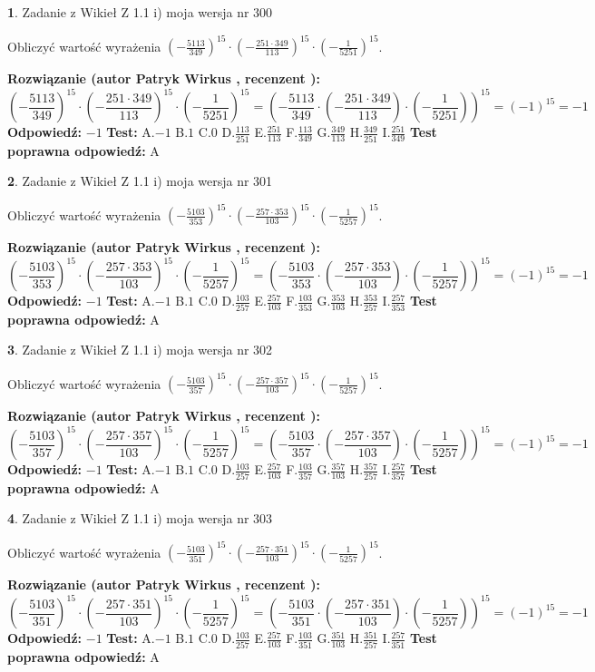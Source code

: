 \documentclass[12pt, a4paper]{article}
\theoremstyle{definition} %
\newtheorem{zad}{}
\newcommand{\zadStart}[1]{\begin{zad}#1\newline}
\newcommand{\zadStop}{\end{zad}}
\newcommand{\rozwStart}[2]{\noindent \textbf{Rozwiązanie (autor #1 , recenzent #2): }\newline}
\newcommand{\rozwStop}{\newline}
\newcommand{\odpStart}{\noindent \textbf{Odpowiedź:}\newline}
\newcommand{\odpStop}{\newline}
\newcommand{\testStart}{\noindent \textbf{Test:}\newline}
\newcommand{\testStop}{\newline}
\newcommand{\kluczStart}{\noindent \textbf{Test poprawna odpowiedź:}\newline}
\newcommand{\kluczStop}{\newline}
\begin{document}
\zadStart{Zadanie z Wikieł Z 1.1 i) moja wersja nr 300}

Obliczyć wartość wyrażenia $(-\frac{5113}{349})^{15} \cdot (-\frac{251 \cdot 349}{113})^{15} \cdot (-\frac{1}{5251})^{15}$.
\zadStop
\rozwStart{Patryk Wirkus}{}
$$(-\frac{5113}{349})^{15} \cdot (-\frac{251 \cdot 349}{113})^{15} \cdot (-\frac{1}{5251})^{15} = (-\frac{5113}{349} \cdot (-\frac{251 \cdot 349}{113}) \cdot (-\frac{1}{5251}))^{15} = (-1)^{15} = -1$$
\rozwStop
\odpStart
$-1$
\odpStop
\testStart
A.$-1$ B.$1$ C.$0$ D.$\frac{113}{251}$ E.$\frac{251}{113}$
F.$\frac{113}{349}$ G.$\frac{349}{113}$
H.$\frac{349}{251}$
I.$\frac{251}{349}$
\testStop
\kluczStart
A
\kluczStop



\zadStart{Zadanie z Wikieł Z 1.1 i) moja wersja nr 301}

Obliczyć wartość wyrażenia $(-\frac{5103}{353})^{15} \cdot (-\frac{257 \cdot 353}{103})^{15} \cdot (-\frac{1}{5257})^{15}$.
\zadStop
\rozwStart{Patryk Wirkus}{}
$$(-\frac{5103}{353})^{15} \cdot (-\frac{257 \cdot 353}{103})^{15} \cdot (-\frac{1}{5257})^{15} = (-\frac{5103}{353} \cdot (-\frac{257 \cdot 353}{103}) \cdot (-\frac{1}{5257}))^{15} = (-1)^{15} = -1$$
\rozwStop
\odpStart
$-1$
\odpStop
\testStart
A.$-1$ B.$1$ C.$0$ D.$\frac{103}{257}$ E.$\frac{257}{103}$
F.$\frac{103}{353}$ G.$\frac{353}{103}$
H.$\frac{353}{257}$
I.$\frac{257}{353}$
\testStop
\kluczStart
A
\kluczStop



\zadStart{Zadanie z Wikieł Z 1.1 i) moja wersja nr 302}

Obliczyć wartość wyrażenia $(-\frac{5103}{357})^{15} \cdot (-\frac{257 \cdot 357}{103})^{15} \cdot (-\frac{1}{5257})^{15}$.
\zadStop
\rozwStart{Patryk Wirkus}{}
$$(-\frac{5103}{357})^{15} \cdot (-\frac{257 \cdot 357}{103})^{15} \cdot (-\frac{1}{5257})^{15} = (-\frac{5103}{357} \cdot (-\frac{257 \cdot 357}{103}) \cdot (-\frac{1}{5257}))^{15} = (-1)^{15} = -1$$
\rozwStop
\odpStart
$-1$
\odpStop
\testStart
A.$-1$ B.$1$ C.$0$ D.$\frac{103}{257}$ E.$\frac{257}{103}$
F.$\frac{103}{357}$ G.$\frac{357}{103}$
H.$\frac{357}{257}$
I.$\frac{257}{357}$
\testStop
\kluczStart
A
\kluczStop



\zadStart{Zadanie z Wikieł Z 1.1 i) moja wersja nr 303}

Obliczyć wartość wyrażenia $(-\frac{5103}{351})^{15} \cdot (-\frac{257 \cdot 351}{103})^{15} \cdot (-\frac{1}{5257})^{15}$.
\zadStop
\rozwStart{Patryk Wirkus}{}
$$(-\frac{5103}{351})^{15} \cdot (-\frac{257 \cdot 351}{103})^{15} \cdot (-\frac{1}{5257})^{15} = (-\frac{5103}{351} \cdot (-\frac{257 \cdot 351}{103}) \cdot (-\frac{1}{5257}))^{15} = (-1)^{15} = -1$$
\rozwStop
\odpStart
$-1$
\odpStop
\testStart
A.$-1$ B.$1$ C.$0$ D.$\frac{103}{257}$ E.$\frac{257}{103}$
F.$\frac{103}{351}$ G.$\frac{351}{103}$
H.$\frac{351}{257}$
I.$\frac{257}{351}$
\testStop
\kluczStart
A
\kluczStop
\end{document}
